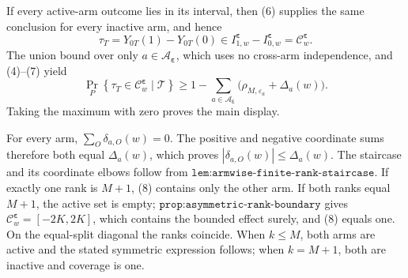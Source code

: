 If every active-arm outcome lies in its interval, then (6) supplies the same conclusion for every inactive arm, and hence
\[
\tau_T=Y_{0T}(1)-Y_{0T}(0)
\in I^{\boldsymbol\varepsilon}_{1,w}-I^{\boldsymbol\varepsilon}_{0,w}
=\mathcal C^{\boldsymbol\varepsilon}_w.
\tag{7}
\]
The union bound over only \(a\in\mathcal A_{\boldsymbol\varepsilon}\), which uses no cross-arm independence, and (4)--(7) yield
\[
\Pr_P\!\left\{\tau_T\in\mathcal C^{\boldsymbol\varepsilon}_w\mid\mathcal T\right\}
\ge 1-\sum_{a\in\mathcal A_{\boldsymbol\varepsilon}}\bigl(\rho_{M,\varepsilon_a}+\Delta_a(w)\bigr).
\tag{8}
\]
Taking the maximum with zero proves the main display.

For every arm, \(\sum_O\delta_{a,O}(w)=0\). The positive and negative coordinate sums therefore both equal \(\Delta_a(w)\), which proves \(|\delta_{a,O}(w)|\le\Delta_a(w)\). The staircase and its coordinate elbows follow from \(\texttt{lem:armwise-finite-rank-staircase}\). If exactly one rank is \(M+1\), (8) contains only the other arm. If both ranks equal \(M+1\), the active set is empty; \(\texttt{prop:asymmetric-rank-boundary}\) gives \(\mathcal C^{\boldsymbol\varepsilon}_w=[-2K,2K]\), which contains the bounded effect surely, and (8) equals one. On the equal-split diagonal the ranks coincide. When \(k\le M\), both arms are active and the stated symmetric expression follows; when \(k=M+1\), both are inactive and coverage is one.